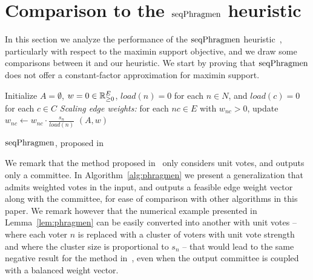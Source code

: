 \section{Comparison to the $\operatorname{seqPhragmen}$ heuristic}\label{s:phragmen}

In this section we analyze the performance of the $\operatorname{seqPhragmen}$ heuristic~\cite{brill2017phragmen}, particularly with respect to the maximin support objective, and we draw some comparisons between it and our heuristic. 
We start by proving that $\operatorname{seqPhragmen}$ does not offer a constant-factor approximation for maximin support.

\begin{algorithm}[htb]\label{alg:phragmen}
\SetAlgoLined
{}
Initialize $A=\emptyset$, $w=0\in \mathbb{R}_{\geq 0}^E$, $load(n)=0$ for each $n\in N$, and $load(c)=0$ for each $c\in C$\;
\emph{Scaling edge weights:} for each $nc\in E$ with $w_{nc}>0$, update $w_{nc}\leftarrow w_{nc}\cdot \frac{s_n}{load(n)}$\; 
\Return $(A,w)$\;
\caption{$\operatorname{seqPhragmen}$, proposed in~\cite{brill2017phragmen}}
\end{algorithm}

We remark that the method proposed in~\cite{brill2017phragmen} only considers unit votes, and outputs only a committee. 
In Algorithm~\ref{alg:phragmen} we present a generalization that admits weighted votes in the input, and outputs a feasible edge weight vector along with the committee, for ease of comparison with other algorithms in this paper. 
We remark however that the numerical example presented in Lemma~\ref{lem:phragmen} can be easily converted into another with unit votes -- where each voter $n$ is replaced with a cluster of voters with unit vote strength and where the cluster size is proportional to $s_n$ -- that would lead to the same negative result for the method in~\cite{brill2017phragmen}, 
even when the output committee is coupled with a balanced weight vector.

